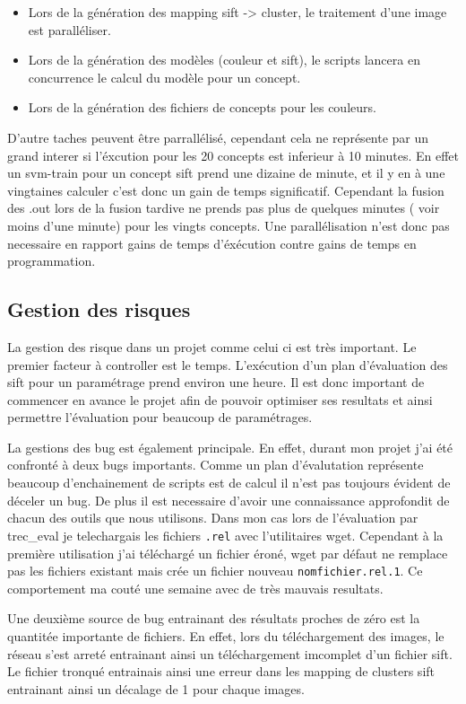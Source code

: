 \documentclass[a4paper, 11pt]{article}
\begin{document}
\begin{itemize}
	\item Lors de la génération des mapping sift -> cluster, le traitement d'une image est paralléliser.
	\item Lors de la génération des modèles (couleur et sift), le scripts lancera en concurrence le calcul du modèle pour un concept.
	\item Lors de la génération des fichiers de concepts pour les couleurs.
\end{itemize}

D'autre taches peuvent être parrallélisé, cependant cela ne représente par un grand interer si l'éxcution pour les 20 concepts est inferieur à 10 minutes. En effet un svm-train pour un concept sift prend une dizaine de minute, et il y en à une vingtaines calculer c'est donc un gain de temps significatif. Cependant la fusion des .out lors de la fusion tardive ne prends pas plus de quelques minutes ( voir moins d'une minute) pour les vingts concepts. Une parallélisation n'est donc pas necessaire en rapport gains de temps d'éxécution contre gains de temps en programmation.

\subsection{Gestion des risques}
La gestion des risque dans un projet comme celui ci est très important. Le premier facteur à controller est le temps. L'exécution d'un plan d'évaluation des sift pour un paramétrage prend environ une heure. Il est donc important de commencer en avance le projet afin de pouvoir optimiser ses resultats et ainsi permettre l'évaluation pour beaucoup de paramétrages. 

La gestions des bug est également principale. En effet, durant mon projet j'ai été confronté à deux bugs importants. Comme un plan d'évalutation représente beaucoup d'enchainement de scripts est de calcul il n'est pas toujours évident de déceler un bug. De plus il est necessaire d'avoir une connaissance approfondit de chacun des outils que nous utilisons. Dans mon cas lors de l'évaluation par trec\_eval je telechargais les fichiers \texttt{.rel} avec l'utilitaires wget. Cependant à la première utilisation j'ai téléchargé un fichier éroné, wget par défaut ne remplace pas les fichiers existant mais crée un fichier nouveau \texttt{nomfichier.rel.1}. Ce comportement ma couté une semaine avec de très mauvais resultats.

Une deuxième source de bug entrainant des résultats proches de zéro est la quantitée importante de fichiers. En effet, lors du téléchargement des images, le réseau s'est arreté entrainant ainsi un téléchargement imcomplet d'un fichier sift. Le fichier tronqué entrainais ainsi une erreur dans les mapping de clusters sift entrainant ainsi un décalage de 1 pour chaque images.
\end{document}
